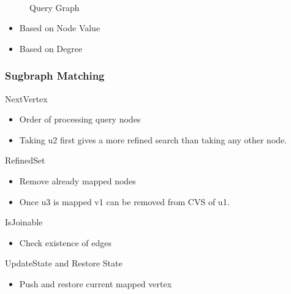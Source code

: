 \documentclass{beamer}
\begin{document}
\begin{frame}
\begin{figure}
\begin{minipage}{.4\textwidth}
\begin{tikzpicture}[node distance=2cm,node/.style={rounded corners,draw,font=\sffamily\small\bfseries}]
\end{tikzpicture}
\\ Query Graph
\end{minipage}
\caption{}
\end{figure}
\begin{itemize}
\item Based on Node Value
\item Based on Degree
\end{itemize}
\end{frame}

\begin{frame}
\frametitle{Sugbraph Matching}
\begin{block}{NextVertex}
\begin{itemize}
\item Order of processing query nodes
\item Taking u2 first gives a more refined search than taking any other node. 
\end{itemize}
\end{block}
\begin{block}{RefinedSet}
\begin{itemize}
\item Remove already mapped nodes
\item Once u3 is mapped v1 can be removed from CVS of u1.
\end{itemize}
\end{block}
\begin{block}{IsJoinable}
\begin{itemize}
\item Check existence of edges
\end{itemize}
\end{block}
\begin{block}{UpdateState and Restore State}
\begin{itemize}
\item Push and restore current mapped vertex
\end{itemize}
\end{block}
\end{frame}
\end{document}

